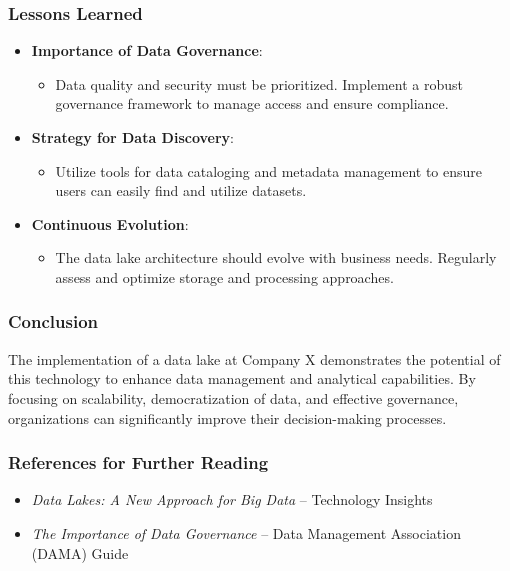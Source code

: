 \documentclass[aspectratio=169]{beamer}
\begin{document}
\begin{frame}[fragile]
    \frametitle{Lessons Learned}
    \begin{itemize}
        \item \textbf{Importance of Data Governance}:
        \begin{itemize}
            \item Data quality and security must be prioritized. Implement a robust governance framework to manage access and ensure compliance.
        \end{itemize}
        
        \item \textbf{Strategy for Data Discovery}:
        \begin{itemize}
            \item Utilize tools for data cataloging and metadata management to ensure users can easily find and utilize datasets.
        \end{itemize}
        
        \item \textbf{Continuous Evolution}:
        \begin{itemize}
            \item The data lake architecture should evolve with business needs. Regularly assess and optimize storage and processing approaches.
        \end{itemize}
    \end{itemize}
\end{frame}

\begin{frame}[fragile]
    \frametitle{Conclusion}
    The implementation of a data lake at Company X demonstrates the potential of this technology to enhance data management and analytical capabilities. By focusing on scalability, democratization of data, and effective governance, organizations can significantly improve their decision-making processes.
\end{frame}

\begin{frame}[fragile]
    \frametitle{References for Further Reading}
    \begin{itemize}
        \item \textit{Data Lakes: A New Approach for Big Data} – Technology Insights
        \item \textit{The Importance of Data Governance} – Data Management Association (DAMA) Guide
    \end{itemize}
\end{frame}
\end{document}
